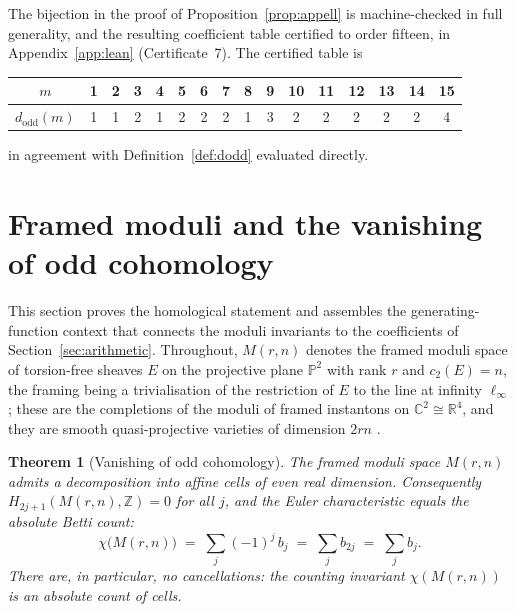 \documentclass[11pt,a4paper]{article}
\newcommand{\R}{\mathbb{R}}
\newcommand{\Z}{\mathbb{Z}}
\newcommand{\C}{\mathbb{C}}
\newcommand{\PP}{\mathbb{P}}
\newcommand{\dodd}{d_{\mathrm{odd}}}
\newcommand{\Mod}{M}
\theoremstyle{plain}
\newtheorem{theorem}{Theorem}[section]
\theoremstyle{definition}
\theoremstyle{remark}
\begin{document}
The bijection in the proof of Proposition~\ref{prop:appell} is
machine-checked in full generality, and the resulting coefficient
table certified to order fifteen, in Appendix~\ref{app:lean}
(Certificate~7). The certified table is
\begin{center}
\begin{tabular}{c|ccccccccccccccc}
$m$ & 1 & 2 & 3 & 4 & 5 & 6 & 7 & 8 & 9 & 10 & 11 & 12 & 13 & 14 & 15 \\
\midrule
$\dodd(m)$ & 1 & 1 & 2 & 1 & 2 & 2 & 2 & 1 & 3 & 2 & 2 & 2 & 2 & 2 & 4
\end{tabular}
\end{center}
in agreement with Definition~\ref{def:dodd} evaluated directly.

\section{Framed moduli and the vanishing of odd cohomology}\label{sec:moduli}

This section proves the homological statement and assembles the
generating-function context that connects the moduli invariants to
the coefficients of Section~\ref{sec:arithmetic}. Throughout,
$\Mod(r,n)$ denotes the framed moduli space of torsion-free sheaves
$E$ on the projective plane $\PP^2$ with rank $r$ and $c_2(E) = n$,
the framing being a trivialisation of the restriction of $E$ to the
line at infinity $\ell_\infty$; these are the completions of the
moduli of framed instantons on $\C^2 \cong \R^4$, and they are smooth
quasi-projective varieties of dimension $2rn$
\cite{NakajimaYoshioka}.

\begin{theorem}[Vanishing of odd cohomology]\label{thm:betti}
The framed moduli space $\Mod(r,n)$ admits a decomposition into
affine cells of even real dimension. Consequently
$H_{2j+1}(\Mod(r,n), \Z) = 0$ for all $j$, and the Euler
characteristic equals the absolute Betti count:
\begin{equation}\label{eq:chiabs}
  \chi\bigl(\Mod(r,n)\bigr) \;=\; \sum_j (-1)^j\, b_j \;=\; \sum_j b_{2j}
  \;=\; \sum_j b_j .
\end{equation}
There are, in particular, no cancellations: the counting invariant
$\chi(\Mod(r,n))$ is an absolute count of cells.
\end{theorem}
\end{document}
